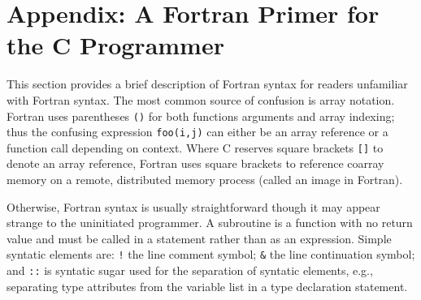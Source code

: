 \section*{Appendix: A Fortran Primer for the C Programmer}

This section provides a brief description of Fortran syntax for readers unfamiliar with Fortran
syntax.  The most common source of confusion is array notation.  Fortran uses parentheses
\texttt{()} for both functions arguments and array indexing; thus the confusing expression
\texttt{foo(i,j)} can either be an array reference or a function call depending on context.  Where C
reserves square brackets \texttt{[]} to denote an array reference, Fortran uses square brackets to
reference coarray memory on a remote, distributed memory process (called an image in Fortran).

Otherwise, Fortran syntax is usually straightforward though it may appear strange to the uninitiated
programmer.  A subroutine is a function with no return value and must be called in a statement
rather than as an expression.  Simple syntatic elements are: \texttt{!} the line comment symbol;
\texttt{\&} the line continuation symbol; and \texttt{::} is syntatic sugar used for the separation
of syntatic elements, e.g., separating type attributes from the variable list in a type declaration
statement.
